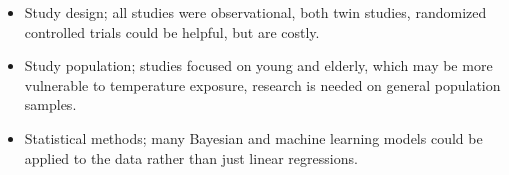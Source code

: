 \documentclass[basic]{inVerba-notes}
\begin{document}
\begin{itemize}
\begin{itemize}
\begin{itemize}
          \begin{itemize}
            \item Study design; all studies were observational, both twin studies, randomized controlled trials could be helpful, but are costly.
            \item Study population; studies focused on young and elderly, which may be more vulnerable to temperature exposure, research is needed on general population samples.
            \item Statistical methods; many Bayesian and machine learning models could be applied to the data rather than just linear regressions. 
          \end{itemize}
      \end{itemize}
\end{itemize}

\end{itemize}

\nocite{xu2020environmental}


\end{document}
